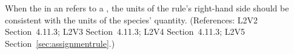 When the  in an \AssignmentRule refers to a \Species, the
units of the rule's right-hand side should be consistent with the units of
the species' quantity.  (References: L2V2 Section~4.11.3;
L2V3 Section~4.11.3; L2V4 Section~4.11.3; L2V5 Section~\ref{sec:assignmentrule}.)
